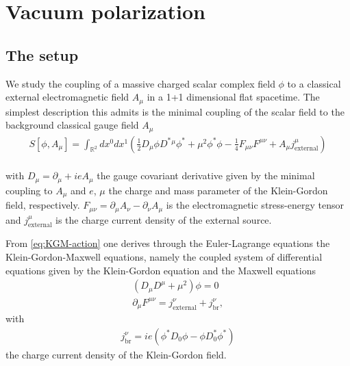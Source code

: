 \chapter{Vacuum polarization}
\label{cha:Vacuum-Polarization}

\section{The setup}

We study the coupling of a massive charged scalar complex field $\phi$ to a classical external electromagnetic field $A_\mu$ in a 1+1 dimensional flat spacetime. The simplest description this admits is the minimal coupling of the scalar field to the background classical gauge field $A_\mu$
\begin{align}
	S [\phi, A_\mu] = \int_{\mathbb{R}^2}^{} dx^{0}dx^{1} \left( \frac{1}{2}D_\mu \phi D^*{}^{\mu}\phi^* 
	+ \mu^2\phi^* \phi - \frac{1}{4}F_{\mu\nu} F^{\mu\nu} + A_\mu j_{\text{external}}^{\mu} \right)  	
	\label{eq:KGM-action}
\end{align}
 \\
with $D_\mu = \partial_\mu + ieA_\mu$ the gauge covariant derivative given by the minimal coupling to $A_\mu$ and  $e$, $\mu$ the charge and mass parameter of the Klein-Gordon field, respectively. $F_{\mu\nu} = \partial_\mu A_\nu - \partial_\nu A_\mu$ is the electromagnetic stress-energy tensor and $j_{\text{external}}^\mu$ is the charge current density of the external source.

From \eqref{eq:KGM-action}  one derives through the Euler-Lagrange equations the Klein-Gordon-Maxwell equations, namely the coupled system of differential equations given by the Klein-Gordon equation and the Maxwell equations
\begin{subequations}
	\begin{align}
			\left( D_\mu D^\mu + \mu^2  \right) \phi = 0 
		\label{eq:klein-gordon-equation}\\
			\partial_\mu F^{\mu\nu}= j_{\text{external}}^{\nu} + j_\text{br}^{\nu} ,
		\label{eq:quantum-maxwell-equation}
	\end{align}
\end{subequations}
with 
\begin{align}
	j^{\nu}_{\text{br}} = ie\left( \phi^* D_0 \phi - \phi D_0^* \phi^* \right) 
\end{align}
the charge current density of the Klein-Gordon field. 


